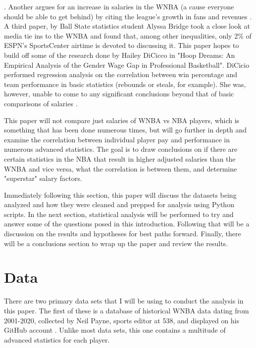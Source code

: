 \documentclass[12pt, titlepage]{article}
\begin{document}
\citep{baker2020comparison}. Another argues for an increase in salaries in the WNBA (a cause everyone
should be able to get behind) by citing the league's growth in fans and revenues \citep{ettienne2019s}. A third paper, by Ball State statistics student 
Alyssa Bridge took a close look at media tie ins to the WNBA and found that, among other inequalities, only 2\% of ESPN’s SportsCenter airtime is devoted 
to discussing it. \citep{Bridge}
This paper hopes to build off some of the research done by Hailey DiCicco in "Hoop Dreams: An Empirical Analysis of the Gender Wage Gap in Professional 
Basketball". DiCicio performed regression analysis on the correlation between win percentage and team performance in basic statistics (rebounds or steals, 
for example). She was, however, unable to come to any significant conclusions beyond that of basic comparisons of salaries \citep{Hoop_Dreams}.
\par
This paper will not compare just salaries of WNBA vs NBA players, which is something that has been done numerous times, but will go further in depth and 
examine the correlation between individual player pay and performance in numerous advanced statistics. The goal is to draw conclusions on if there 
are certain statistics in the NBA that result in higher adjusted salaries than the WNBA and vice versa, what the correlation is between them, and 
determine "superstar" salary factors.
\par
Immediately following this section, this paper will discuss the datasets being analyzed and how they were cleaned and prepped for analysis using Python 
scripts. In the next section, statistical analysis will be performed to try and answer some of the questions posed in this introduction. Following that 
will be a discussion on the results and hypotheses for best paths forward. Finally, there will be a conclusions section to wrap up the paper and review 
the results.


\section{Data}
\hspace*{10mm}
There are two primary data sets that I will be using to conduct the analysis in this paper. The first of these is a database of historical WNBA data 
dating from 2001-2020, collected by Neil Payne, sports editor at 538, and displayed on his GitHub account \citep{first}. Unlike most data sets, this one 
contains a multitude of advanced statistics for each player.
\end{document}
